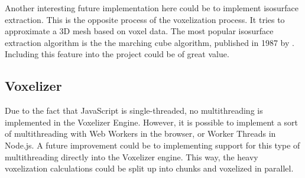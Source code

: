 Another interesting future implementation here could be to implement isosurface extraction. This is the opposite process of the voxelization process. It tries to approximate a 3D mesh based on voxel data. The most popular isosurface extraction algorithm is the the marching cube algorithm, published in 1987 by \citet{marching-cubes-cline-lorentsen}. Including this feature into the project could be of great value.

\subsection{Voxelizer}
Due to the fact that JavaScript is single-threaded, no multithreading is implemented in the Voxelizer Engine. However, it is possible to implement a sort of multithreading with Web Workers in the browser, or Worker Threads in Node.js. A future improvement could be to implementing support for this type of multithreading directly into the Voxelizer engine. This way, the heavy voxelization calculations could be split up into chunks and voxelized in parallel.
